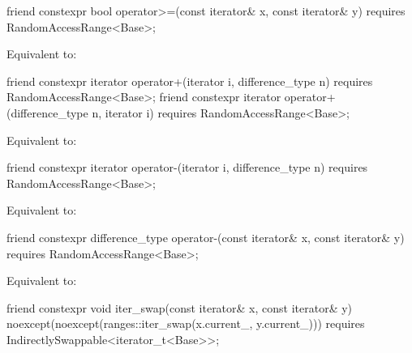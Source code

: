 %
\begin{itemdecl}
friend constexpr bool operator>=(const iterator& x, const iterator& y)
  requires RandomAccessRange<Base>;
\end{itemdecl}

\begin{itemdescr}
\pnum
\effects Equivalent to: 
\end{itemdescr}

\begin{itemdecl}
friend constexpr iterator operator+(iterator i, difference_type n)
  requires RandomAccessRange<Base>;
friend constexpr iterator operator+(difference_type n, iterator i)
  requires RandomAccessRange<Base>;
\end{itemdecl}

\begin{itemdescr}
\pnum
\effects Equivalent to: 
\end{itemdescr}

%
\begin{itemdecl}
friend constexpr iterator operator-(iterator i, difference_type n)
  requires RandomAccessRange<Base>;
\end{itemdecl}

\begin{itemdescr}
\pnum
\effects Equivalent to: 
\end{itemdescr}

%
\begin{itemdecl}
friend constexpr difference_type operator-(const iterator& x, const iterator& y)
  requires RandomAccessRange<Base>;
\end{itemdecl}

\begin{itemdescr}
\pnum
\effects Equivalent to: 
\end{itemdescr}

\begin{itemdecl}
friend constexpr void iter_swap(const iterator& x, const iterator& y)
  noexcept(noexcept(ranges::iter_swap(x.current_, y.current_)))
  requires IndirectlySwappable<iterator_t<Base>>;
\end{itemdecl}


